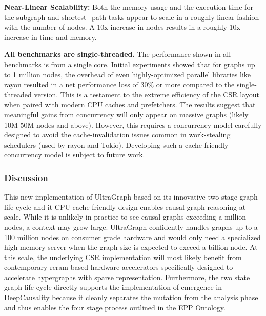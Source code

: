 \textbf{Near-Linear Scalability:} Both the memory usage and the execution time for the subgraph and shortest\_path tasks appear to scale in a roughly linear fashion with the number of nodes. 
A 10x increase in nodes results in a roughly 10x increase in time and memory. 

\textbf{All benchmarks are single-threaded.} The performance shown in all benchmarks is from a single core. Initial experiments showed that for graphs up to 1 million nodes, the overhead of even highly-optimized parallel libraries like rayon resulted in a  net performance loss of 30\% or more compared to the single-threaded version. This is a testament to the extreme  efficiency of the CSR layout when paired with modern CPU caches and prefetchers.  The results suggest that meaningful gains from concurrency will only appear on massive graphs (likely 10M-50M nodes  and above). However, this requires a concurrency model carefully designed to avoid the cache-invalidation issues common in work-stealing schedulers (used by rayon and Tokio). Developing such a cache-friendly concurrency model is subject to future work. 

\subsubsection{Discussion}

This new implementation of UltraGraph based on its innovative two stage graph life-cycle and it CPU cache friendly design enables causal graph reasoning at scale. While it is unlikely in practice to see causal graphs exceeding a million nodes, a context may grow large. UltraGraph confidently handles graphs up to a 100 million nodes on consumer grade hardware and would only need a specialized high memory server when the graph size is expected to exceed a billion node. At this scale, the underlying CSR implementation will most likely benefit from contemporary reram-based\cite{zheng2023phgraph} hardware accelerators specifically designed to accelerate hypergraphs with sparse representation. 
Furthermore, the two state graph life-cycle directly supports the implementation of emergence in DeepCausality because it cleanly separates the mutation from the analysis phase and thus enables the four stage process outlined in the EPP Ontology.  

\newpage